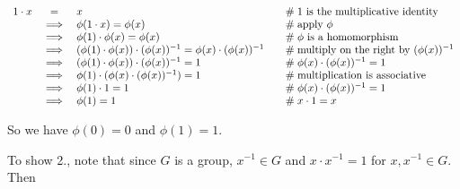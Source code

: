 \documentclass[11pt, oneside]{article}   	%
\theoremstyle{definition}
\begin{document}
\begin{equation}
\begin{array}{rcll}
1 \cdot x 
&=& x                                                                                                                         &\quad \mathrel{\#} \text{$1$ is the multiplicative identity} \\
&\implies& \phi(1 \cdot x) = \phi(x)                                                                             &\quad \mathrel{\#} \text{apply $\phi$} \\
&\implies& \phi(1) \cdot \phi(x) = \phi(x)                                                                     &\quad \mathrel{\#} \phi \text{ is a homomorphism}          \\
&\implies& (\phi(1) \cdot \phi(x)) \cdot  (\phi(x))^{-1} = \phi(x) \cdot  (\phi(x))^{-1}      &\quad \mathrel{\#} \text{multiply on the right by $ (\phi(x))^{-1}$} \\
&\implies& (\phi(1) \cdot \phi(x)) \cdot  (\phi(x))^{-1} = 1                                             &\quad \mathrel{\#}\phi(x) \cdot  (\phi(x))^{-1}  = 1 \\
&\implies& \phi(1) \cdot (\phi(x) \cdot  (\phi(x))^{-1}) = 1                                             &\quad \mathrel{\#} \text{multiplication is associative} \\
&\implies& \phi(1) \cdot 1 = 1                                                                                      &\quad \mathrel{\#} \phi(x) \cdot  (\phi(x))^{-1} = 1 \\
&\implies&  \phi(1) = 1                                                                                                 &\quad \mathrel{\#}  x \cdot 1 = x
\end{array}
\label{eqn:1}
\end{equation}

\bigskip
\noindent
So we have $\phi(0) = 0$ and  $\phi(1) = 1$. 

\bigskip
\noindent
To show 2., note that since $G$ is a group, $x^{-1} \in G$ and  $x \cdot x^{-1} = 1$ for $x, x^{-1}  \in G$. Then
\end{document}
